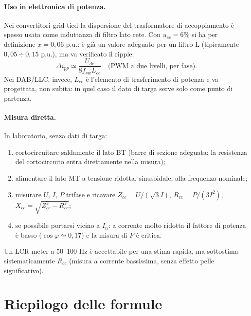 \documentclass[11pt,a4paper]{article}
\begin{document}
\paragraph{Uso in elettronica di potenza.} Nei convertitori grid-tied la dispersione del
trasformatore di accoppiamento è spesso usata come induttanza di filtro lato rete. Con
$u_{cc}=6\%$ si ha per definizione $x = 0{,}06$ p.u.: è già un valore adeguato per un
filtro L (tipicamente $0{,}05\div0{,}15$ p.u.), ma va verificato il ripple:
\begin{equation}
\Delta i_{pp} \simeq \frac{U_{dc}}{8 f_{sw} L_{cc}} \quad\text{(PWM a due livelli, per fase)} .
\end{equation}
Nei DAB/LLC, invece, $L_{cc}$ è l'elemento di trasferimento di potenza e va progettata,
non subita: in quel caso il dato di targa serve solo come punto di partenza.

\paragraph{Misura diretta.} In laboratorio, senza dati di targa:
\begin{enumerate}
  \item cortocircuitare saldamente il lato BT (barre di sezione adeguata: la resistenza
        del cortocircuito entra direttamente nella misura);
  \item alimentare il lato MT a tensione ridotta, sinusoidale, alla frequenza nominale;
  \item misurare $U$, $I$, $P$ trifase e ricavare
        $Z_{cc}=U/(\sqrt3 I)$, $R_{cc}=P/(3I^2)$, $X_{cc}=\sqrt{Z_{cc}^2-R_{cc}^2}$;
  \item se possibile portarsi vicino a $I_n$: a corrente molto ridotta il fattore di
        potenza è basso ($\cos\varphi \simeq 0{,}17$) e la misura di $P$ è critica.
\end{enumerate}
Un LCR meter a 50--100 Hz è accettabile per una stima rapida, ma sottostima
sistematicamente $R_{cc}$ (misura a corrente bassissima, senza effetto pelle
significativo).

\section{Riepilogo delle formule}
\end{document}
